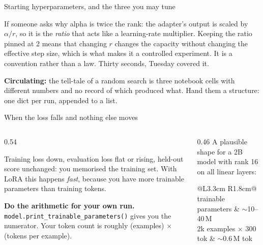 \documentclass[aspectratio=169,10pt]{beamer}
\begin{document}
\begin{frame}[shrink=9]{Starting hyperparameters, and the three you may tune}
{  If someone asks why alpha is twice the rank: the adapter's output is scaled
  by $\alpha/r$, so it is the \emph{ratio} that acts like a learning-rate
  multiplier. Keeping the ratio pinned at 2 means that changing $r$ changes the
  capacity without changing the effective step size, which is what makes it a
  controlled experiment. It is a convention rather than a law. Thirty seconds,
  Tuesday covered it.

  \textbf{Circulating:} the tell-tale of a random search is three notebook
  cells with different numbers and no record of which produced what. Hand them
  a structure: one dict per run, appended to a list.}
\end{frame}

\begin{frame}{When the loss falls and nothing else moves}
  \begin{columns}[T]
    \begin{column}{0.54\textwidth}
      \begin{gotcha}
        Training loss down, evaluation loss flat or rising, held-out score
        unchanged: you memorised the training set.
        \vspace{0.4em}
        With LoRA this happens \emph{fast}, because you have more trainable
        parameters than training tokens.
      \end{gotcha}
      \vspace{0.5em}
      \small
      \textbf{Do the arithmetic for your own run.}
      \texttt{model.print\_trainable\_parameters()} gives you the numerator.
      Your token count is roughly
      (examples) $\times$ (tokens per example).
    \end{column}
    \begin{column}{0.46\textwidth}
      \small
      A plausible shape for a 2B model with rank 16 on all linear layers:
      \vspace{0.3em}
      \begin{tabular}{@{}L{3.3cm} R{1.8cm}@{}}
        \toprule
        trainable parameters & $\sim$10--40\,M\\
        2k examples $\times$ 300 tok & $\sim$0.6\,M tok\\
        \bottomrule
      \end{tabular}
      \vspace{0.5em}


\end{column}
\end{columns}
\end{frame}
\end{document}
